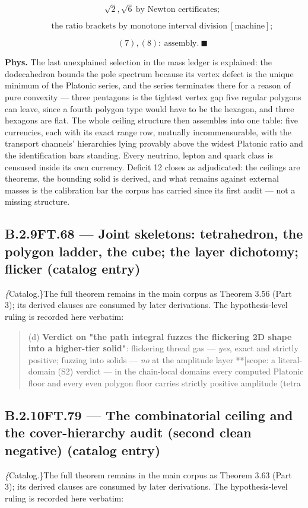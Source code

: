 \documentclass[11pt,openany]{report}
\theoremstyle{canonplain}
\theoremstyle{canondef}
\begin{document}
\[
\qquad \sqrt2,\sqrt6\ \text{by Newton certificates};
\]

\[
\qquad \text{the ratio brackets by monotone interval division}\ [\text{machine}];
\]

\[
\qquad (7),(8):\ \text{assembly}.\ \blacksquare
\]

\textbf{Phys.} The last unexplained selection in the mass ledger is explained: the dodecahedron bounds the pole spectrum because its vertex defect is the unique minimum of the Platonic series, and the series terminates there for a reason of pure convexity — three pentagons is the tightest vertex gap five regular polygons can leave, since a fourth polygon type would have to be the hexagon, and three hexagons are flat. The whole ceiling structure then assembles into one table: five currencies, each with its exact range row, mutually incommensurable, with the transport channels' hierarchies lying provably above the widest Platonic ratio and the identification bars standing. Every neutrino, lepton and quark class is censused inside its own currency. Deficit 12 closes as adjudicated: the ceilings are theorems, the bounding solid is derived, and what remains against external masses is the calibration bar the corpus has carried since its first audit — not a missing structure.

\medskip
\subsection*{\texorpdfstring{B.2.9\quad FT.68 — Joint skeletons: tetrahedron, the polygon ladder, the cube; the layer dichotomy; flicker (catalog entry)}{FT.68 B.2.9}}
\label{tag:FT-68-cat}
{\small \textit\{Catalog.\}\quad The full theorem remains in the main corpus as Theorem 3.56 (Part 3); its derived clauses are consumed by later derivations. The hypothesis-level ruling is recorded here verbatim:}
\begin{quote}\small (d) \textbf{Verdict on "the path integral fuzzes the flickering 2D shape into a higher-tier solid"}: flickering thread gas — \textit{yes}, exact and strictly positive; fuzzing into solids — \textit{no} at the amplitude layer **[scope: a literal-domain (S2) verdict — in the chain-local domains every computed Platonic floor and every even polygon floor carries strictly positive amplitude (tetra\end{quote}
\medskip
\subsection*{\texorpdfstring{B.2.10\quad FT.79 — The combinatorial ceiling and the cover-hierarchy audit (second clean negative) (catalog entry)}{FT.79 B.2.10}}
\label{tag:FT-79-cat}
{\small \textit\{Catalog.\}\quad The full theorem remains in the main corpus as Theorem 3.63 (Part 3); its derived clauses are consumed by later derivations. The hypothesis-level ruling is recorded here verbatim:}
\begin{quote}\small \end{quote}
\medskip
\end{document}
